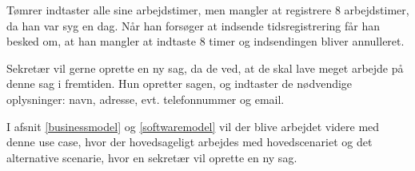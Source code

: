 Tømrer indtaster alle sine arbejdstimer, men mangler at registrere 8 arbejdstimer, da han var syg en dag.
Når han forsøger at indsende tidsregistrering får han besked om, at han mangler at indtaste 8 timer og indsendingen bliver annulleret.

Sekretær vil gerne oprette en ny sag, da de ved, at de skal lave meget arbejde på denne sag i fremtiden.
Hun opretter sagen, og indtaster de nødvendige oplysninger: navn, adresse, evt. telefonnummer og email.

I afsnit \ref{businessmodel} og \ref{softwaremodel} vil der blive arbejdet videre med denne use case, hvor der hovedsageligt arbejdes med hovedscenariet og det alternative scenarie, hvor en sekretær vil oprette en ny sag.


